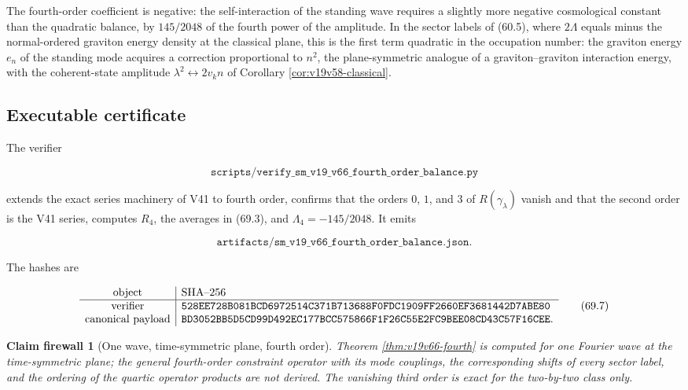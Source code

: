 \documentclass[11pt]{article}
\newtheorem{firewall}[theorem]{Claim firewall}
\theoremstyle{remark}
\begin{document}
The fourth-order coefficient is negative: the self-interaction of the
standing wave requires a slightly more negative cosmological constant
than the quadratic balance, by \(145/2048\) of the fourth power of the
amplitude.  In the sector labels of (60.5), where \(2\Lambda\) equals
minus the normal-ordered graviton energy density at the classical
plane, this is the first term quadratic in the occupation number: the
graviton energy \(e_n\) of the standing mode acquires a correction
proportional to \(n^2\), the plane-symmetric analogue of a
graviton--graviton interaction energy, with the coherent-state
amplitude \(\lambda^2\leftrightarrow2v_kn\) of Corollary
\ref{cor:v19v58-classical}.

\subsection{Executable certificate}

The verifier

\[
 \texttt{scripts/verify\_sm\_v19\_v66\_fourth\_order\_balance.py}    \tag{69.5}
\]

extends the exact series machinery of V41 to fourth order, confirms
that the orders \(0\), \(1\), and \(3\) of \(R(\gamma_\lambda)\) vanish
and that the second order is the V41 series, computes \(R_4\), the
averages in (69.3), and \(\Lambda_4=-145/2048\).  It emits

\[
 \texttt{artifacts/sm\_v19\_v66\_fourth\_order\_balance.json}.       \tag{69.6}
\]

The hashes are

\[
\begin{array}{c|l}
\hbox{object}&\hbox{SHA--256}\\ \hline
\hbox{verifier}&
\texttt{528EE728B081BCD6972514C371B713688F0FDC1909FF2660EF3681442D7ABE80}\\
\hbox{canonical payload}&
\texttt{BD3052BB5D5CD99D492EC177BCC575866F1F26C55E2FC9BEE08CD43C57F16CEE}.
\end{array}                                                     \tag{69.7}
\]

\begin{firewall}[One wave, time-symmetric plane, fourth order]
\label{fire:v19v66}
Theorem \ref{thm:v19v66-fourth} is computed for one Fourier wave at
the time-symmetric plane; the general fourth-order constraint
operator with its mode couplings, the corresponding shifts of every
sector label, and the ordering of the quartic operator products are
not derived.  The vanishing third order is exact for the two-by-two
class only.
\end{firewall}
\end{document}
